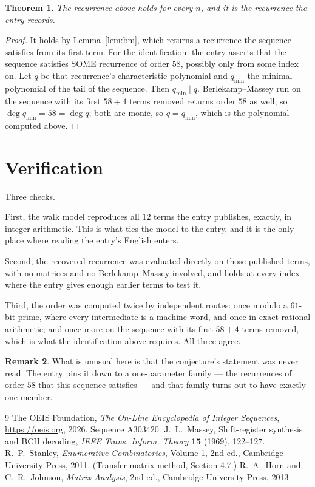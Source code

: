 \documentclass[11pt,a4paper]{article}
\theoremstyle{plain}
\newtheorem{theorem}{Theorem}
\theoremstyle{definition}
\newtheorem{remark}[theorem]{Remark}
\begin{document}
\begin{theorem}
The recurrence above holds for every $n$, and it is the recurrence the entry records.
\end{theorem}

\begin{proof}
It holds by Lemma~\ref{lem:bm}, which returns a recurrence the sequence satisfies from its
first term. For the identification: the entry asserts that the sequence satisfies SOME
recurrence of order $58$, possibly only from some index on. Let $q$ be that recurrence's
characteristic polynomial and $q_{\min}$ the minimal polynomial of the tail of the sequence.
Then $q_{\min}\mid q$. Berlekamp--Massey run on the sequence with its first $58+4$ terms
removed returns order $58$ as well, so $\deg q_{\min}=58=\deg q$; both are monic, so
$q=q_{\min}$, which is the polynomial computed above.
\end{proof}

\section{Verification}

Three checks.

First, the walk model reproduces all $12$ terms the entry publishes, exactly, in integer
arithmetic. This is what ties the model to the entry, and it is the only place where reading
the entry's English enters.

Second, the recovered recurrence was evaluated directly on those published terms, with no
matrices and no Berlekamp--Massey involved, and holds at every index where the entry gives
enough earlier terms to test it.

Third, the order was computed twice by independent routes: once modulo a $61$-bit prime, where
every intermediate is a machine word, and once in exact rational arithmetic; and once more on
the sequence with its first $58+4$ terms removed, which is what the identification above
requires. All three agree.

\begin{remark}
What is unusual here is that the conjecture's statement was never read. The entry pins it down
to a one-parameter family --- the recurrences of order $58$ that this sequence satisfies
--- and that family turns out to have exactly one member.
\end{remark}

\begin{thebibliography}{9}
 The OEIS Foundation, \emph{The On-Line Encyclopedia of Integer
Sequences}, \url{https://oeis.org}, 2026. Sequence A303420.
 J.~L.~Massey, Shift-register synthesis and BCH decoding, \emph{IEEE
Trans. Inform. Theory} \textbf{15} (1969), 122--127.
 R.~P.~Stanley, \emph{Enumerative Combinatorics}, Volume 1, 2nd ed.,
Cambridge University Press, 2011. (Transfer-matrix method, Section 4.7.)
 R.~A.~Horn and C.~R.~Johnson, \emph{Matrix Analysis}, 2nd ed., Cambridge
University Press, 2013.
\end{thebibliography}
\end{document}

